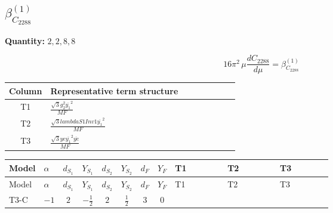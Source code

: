 \documentclass[8pt]{article}
\begin{document}
\begin{landscape}
\section*{$\beta_{C_{2288}}^{(1)}$}
\noindent\textbf{Quantity: }$\mathrm{2,2,8,8}$\par\smallskip
\[16\pi^2\,\mu\frac{d C_{2288}}{d\mu}=\beta_{C_{2288}}^{(1)}\]
\begin{center}
\begin{tabular}{@{}c >{\raggedright\arraybackslash}p{0.82\linewidth}@{}}
\toprule
Column & Representative term structure \\
\midrule
T1 & \(\displaystyle \frac{\sqrt{3} g_{2}^{2} \overline{y_{1}}^{2}}{MF}\) \\
\midrule
T2 & \(\displaystyle \frac{\sqrt{3} lambdaS1Inv1 \overline{y_{1}}^{2}}{MF}\) \\
\midrule
T3 & \(\displaystyle \frac{\sqrt{3} ye \overline{y_{1}}^{2} \overline{ye}}{MF}\) \\
\midrule
\bottomrule
\end{tabular}
\end{center}
\smallskip
\tiny
\begin{longtable}{@{}llcccccc >{\raggedright\arraybackslash}p{0.21\linewidth} >{\raggedright\arraybackslash}p{0.21\linewidth} >{\raggedright\arraybackslash}p{0.21\linewidth}@{}}
\toprule
Model & $\alpha$ & $d_{S_1}$ & $Y_{S_1}$ & $d_{S_2}$ & $Y_{S_2}$ & $d_F$ & $Y_F$ & T1 & T2 & T3 \\
\midrule
\endfirsthead
\toprule
Model & $\alpha$ & $d_{S_1}$ & $Y_{S_1}$ & $d_{S_2}$ & $Y_{S_2}$ & $d_F$ & $Y_F$ & T1 & T2 & T3 \\
\midrule
\endhead
T3-C & $-1$ & $2$ & $-\frac{1}{2}$ & $2$ & $\frac{1}{2}$ & $3$ & $0$ & \scriptsize\adjustbox{max width=\linewidth}{$\begin{gathered} \frac{\sqrt{3} g_{2}^{2} \overline{y_{1}}^{2}}{4 MF}\end{gathered}$} & \scriptsize\adjustbox{max width=\linewidth}{$\begin{gathered} \frac{\sqrt{3} lambdaS1Inv1 \overline{y_{1}}^{2}}{6 MF}\end{gathered}$} & \scriptsize\adjustbox{max width=\linewidth}{$\begin{gathered} - \frac{\sqrt{3} ye \overline{y_{1}}^{2} \overline{ye}}{12 MF}\end{gathered}$} \\
\midrule
\bottomrule
\end{longtable}
\clearpage

\end{landscape}
\end{document}
